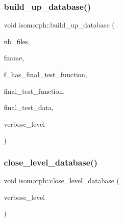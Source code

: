 \mbox{\label{classisomorph_a40bea8f733a5855879f927fc73324384}} 
\subsubsection{\texorpdfstring{build\+\_\+up\+\_\+database()}{build\_up\_database()}}
{\footnotesize\ttfamily void isomorph\+::build\+\_\+up\+\_\+database (\begin{DoxyParamCaption}\item[{\mbox{\hyperlink{galois_8h_a09fddde158a3a20bd2dcadb609de11dc}{I\+NT}}}]{nb\+\_\+files,  }\item[{const \mbox{\hyperlink{galois_8h_ab6cc7b4aeb6ea31aba2b3fbfc83ff5e6}{B\+Y\+TE}} $\ast$$\ast$}]{fname,  }\item[{\mbox{\hyperlink{galois_8h_a09fddde158a3a20bd2dcadb609de11dc}{I\+NT}}}]{f\+\_\+has\+\_\+final\+\_\+test\+\_\+function,  }\item[{\mbox{\hyperlink{galois_8h_a09fddde158a3a20bd2dcadb609de11dc}{I\+NT}}($\ast$)(\mbox{\hyperlink{galois_8h_a09fddde158a3a20bd2dcadb609de11dc}{I\+NT}} $\ast$data, \mbox{\hyperlink{galois_8h_a09fddde158a3a20bd2dcadb609de11dc}{I\+NT}} sz, void $\ast$final\+\_\+test\+\_\+data, \mbox{\hyperlink{galois_8h_a09fddde158a3a20bd2dcadb609de11dc}{I\+NT}} \mbox{\hyperlink{simeon_8_c_a818073fbcc2f439e7c56952f67386122}{verbose\+\_\+level}})}]{final\+\_\+test\+\_\+function,  }\item[{void $\ast$}]{final\+\_\+test\+\_\+data,  }\item[{\mbox{\hyperlink{galois_8h_a09fddde158a3a20bd2dcadb609de11dc}{I\+NT}}}]{verbose\+\_\+level }\end{DoxyParamCaption})}

\mbox{\label{classisomorph_aeca68d029ae707d3a6c6d4293b7086c8}} 
\subsubsection{\texorpdfstring{close\+\_\+level\+\_\+database()}{close\_level\_database()}}
{\footnotesize\ttfamily void isomorph\+::close\+\_\+level\+\_\+database (\begin{DoxyParamCaption}\item[{\mbox{\hyperlink{galois_8h_a09fddde158a3a20bd2dcadb609de11dc}{I\+NT}}}]{verbose\+\_\+level }\end{DoxyParamCaption})}

